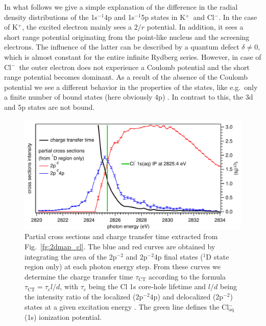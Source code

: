 \documentclass[journal=jpclcd,manuscript=letter]{achemso}
\newcommand{\cli}{Cl$^{-}$}
\newcommand{\ki}{K$^{+}$}
\begin{document}
In what follows we give a simple explanation of the difference in the radial density distributions of the 1s$^{-1}$4p and 1s$^{-1}$5p states in \ki~and \cli. In the case of \ki, the excited electron mainly sees a $2/r$ potential. In addition, it sees a short range potential originating from the point-like nucleus and the screening electrons. The influence of the latter can be described by a quantum defect $\delta \ne 0$, which is almost constant for the entire infinite Rydberg series. However, in case of \cli~the outer electron does not experience a Coulomb potential and the short range potential becomes dominant. As a result of the absence of the Coulomb potential we see a different behavior in the properties of the states, like e.g.\ only a finite number of bound states (here obviously 4p) \citep{buckman94:539}. In contrast to this, the 3d and 5p states are not bound. %


\begin{figure}
\centering
\includegraphics[scale=0.9]{figures/partial_cross_sec_ct_time.pdf}
\caption{Partial cross sections and charge transfer time extracted from Fig.\ \ref{fg:2dmap_cl}. The blue and red curves are obtained by integrating the area of the 2p$^{-2}$ and 2p$^{-2}$4p final states ($^1$D state region only) at each photon energy step. From these curves we determine the charge transfer time $\tau_{\text{CT}}$ according to the formula $\tau_{\text{CT}} = \tau_{c} l/d$, with $\tau_{c}$ being the Cl 1s core-hole lifetime and $l/d$ being the intensity ratio of the localized (2p$^{-2}$4p) and delocalized (2p$^{-2}$) states at a given excitation energy \cite{foehlisch05:373}.  The green line defines the Cl$^{-}_{\text{aq}}$(1s) ionization potential.}
\label{fg:si_ct_time}
\end{figure}

\end{document}
